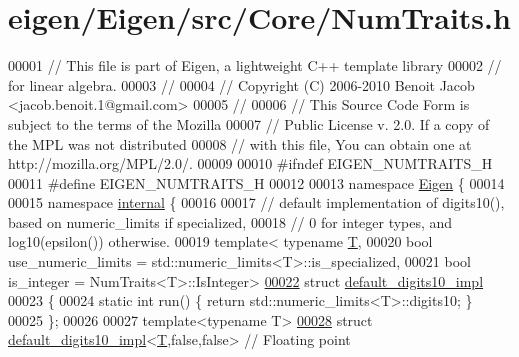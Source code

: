 \hypertarget{eigen_2_eigen_2src_2_core_2_num_traits_8h_source}{}\section{eigen/\+Eigen/src/\+Core/\+Num\+Traits.h}
\label{eigen_2_eigen_2src_2_core_2_num_traits_8h_source}

\begin{DoxyCode}
00001 \textcolor{comment}{// This file is part of Eigen, a lightweight C++ template library}
00002 \textcolor{comment}{// for linear algebra.}
00003 \textcolor{comment}{//}
00004 \textcolor{comment}{// Copyright (C) 2006-2010 Benoit Jacob <jacob.benoit.1@gmail.com>}
00005 \textcolor{comment}{//}
00006 \textcolor{comment}{// This Source Code Form is subject to the terms of the Mozilla}
00007 \textcolor{comment}{// Public License v. 2.0. If a copy of the MPL was not distributed}
00008 \textcolor{comment}{// with this file, You can obtain one at http://mozilla.org/MPL/2.0/.}
00009 
00010 \textcolor{preprocessor}{#ifndef EIGEN\_NUMTRAITS\_H}
00011 \textcolor{preprocessor}{#define EIGEN\_NUMTRAITS\_H}
00012 
00013 \textcolor{keyword}{namespace }\hyperlink{namespace_eigen}{Eigen} \{
00014 
00015 \textcolor{keyword}{namespace }\hyperlink{namespaceinternal}{internal} \{
00016 
00017 \textcolor{comment}{// default implementation of digits10(), based on numeric\_limits if specialized,}
00018 \textcolor{comment}{// 0 for integer types, and log10(epsilon()) otherwise.}
00019 \textcolor{keyword}{template}< \textcolor{keyword}{typename} \hyperlink{group___sparse_core___module_class_eigen_1_1_triplet}{T},
00020           \textcolor{keywordtype}{bool} use\_numeric\_limits = std::numeric\_limits<T>::is\_specialized,
00021           \textcolor{keywordtype}{bool} is\_integer = NumTraits<T>::IsInteger>
\hyperlink{struct_eigen_1_1internal_1_1default__digits10__impl}{00022} \textcolor{keyword}{struct }\hyperlink{struct_eigen_1_1internal_1_1default__digits10__impl}{default\_digits10\_impl}
00023 \{
00024   \textcolor{keyword}{static} \textcolor{keywordtype}{int} run() \{ \textcolor{keywordflow}{return} std::numeric\_limits<T>::digits10; \}
00025 \};
00026 
00027 \textcolor{keyword}{template}<\textcolor{keyword}{typename} T>
\hyperlink{struct_eigen_1_1internal_1_1default__digits10__impl_3_01_t_00_01false_00_01false_01_4}{00028} \textcolor{keyword}{struct }\hyperlink{struct_eigen_1_1internal_1_1default__digits10__impl}{default\_digits10\_impl}<\hyperlink{group___sparse_core___module}{T},false,false> \textcolor{comment}{// Floating point}

\end{DoxyCode}
